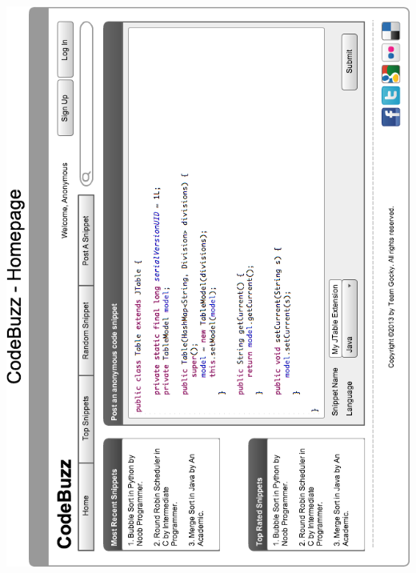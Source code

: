 \documentclass[11pt,a4paper]{article}
\begin{document}
\includegraphics[width=\textwidth]{../imgs/homepageWireFrameGRHorz.png}
\end{document}
